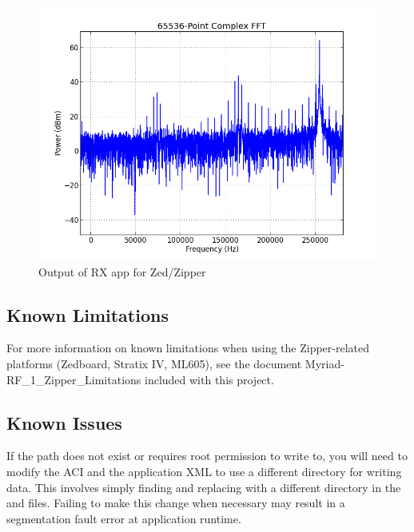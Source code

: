 \documentclass{article}
\begin{document}
        \begin{figure}[h]
                \centering
                \includegraphics[scale=.5]{rx_app_sig_gen_fft_zed_zipper}
                \caption{Output of RX app for Zed/Zipper}
                \label{fig:rx_app_sig_gen_fft_zed_zipper}
        \end{figure}
\subsection{Known Limitations}
\noindent For more information on known limitations when using the Zipper-related platforms (Zedboard, Stratix IV, ML605), see the document Myriad-RF\_1\_Zipper\_Limitations included with this project.\pagebreak
\subsection{Known Issues}
If the path  does not exist or requires root permission to write to, you will need to modify the ACI and the application XML to use a different directory for writing data. This involves simply finding and replacing  with a different directory in the  and  files. Failing to make this change when necessary may result in a segmentation fault error at application runtime.
\end{document}
